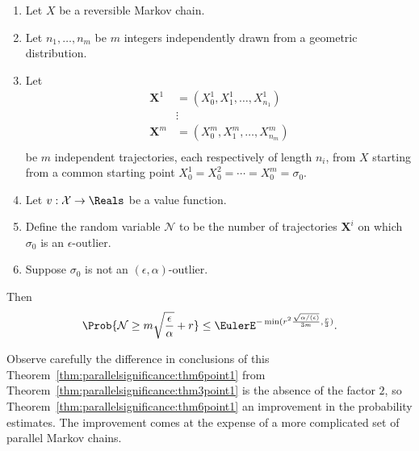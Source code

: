 \documentclass[12pt]{article}
\begin{document}
\begin{theorem}
    \label{thm:parallelsignificance:thm6point1}
    \begin{enumerate}
        \item
            Let \( X \) be a reversible Markov chain.
          \item
            Let \(n_1, \dots, n_m \) be \( m \) integers independently
            drawn from a geometric distribution.
        \item
            Let
            \begin{align*}
                \mathbf{X}^1 &= (X_0^1, X_1^1, \dots, X_{n_1}^1 )\\
                &\vdots \\
                \mathbf{X}^m &= (X_0^m, X_1^m, \dots, X_{n_m}^m )\\
            \end{align*}
            be \( m \) independent trajectories, each respectively  of length \( n_{i} \), from \(
            X \) starting from a common starting point \( X_0^1 =
            X_0^2 = \cdots = X_0^m = \sigma_0 \). 
        \item
            Let \( v :  \mathcal{X} \to \Reals \) be a value function.
        \item
            Define the random variable \( \mathcal{N} \) to be the
            number of trajectories \( \mathbf{X}^i \) on which \( \sigma_0
            \) is an \( \epsilon \)-outlier.
        \item
            Suppose \( \sigma_0 \) is not an \( (\epsilon, \alpha) \)-outlier.
    \end{enumerate}
    Then
    \[
        \Prob{\mathcal{N} \ge m \sqrt{\frac{\epsilon}{\alpha}} + r} \le
        \EulerE^{-\min(r^2 \frac{\sqrt{\alpha/(\epsilon)}}{3m}, \frac{r}
        {3})}.
    \]
\end{theorem}

\begin{remark}
  Observe carefully the difference in conclusions of this
  Theorem~\ref{thm:parallelsignificance:thm6point1} from
Theorem~\ref{thm:parallelsignificance:thm3point1} is the absence of
the factor $2$, so Theorem~\ref{thm:parallelsignificance:thm6point1}
an improvement in the probability estimates.  The improvement comes at
the expense of a more complicated set of parallel Markov chains.
\end{remark}
\end{document}

